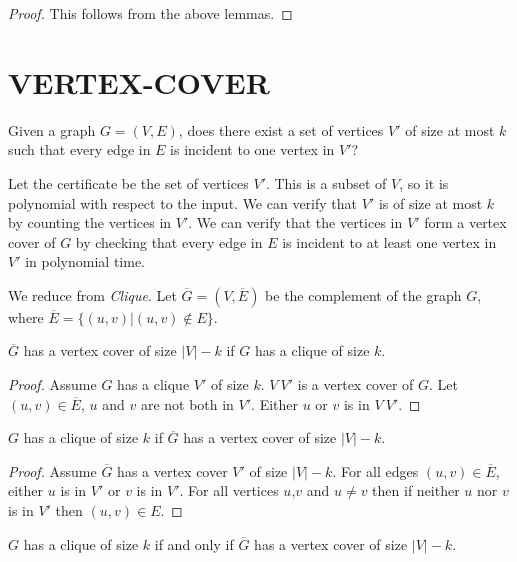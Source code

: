 \begin{proof}
  This follows from the above lemmas.
\end{proof}

\section{VERTEX-COVER}

Given a graph $G=(V,E)$, does there exist a set of vertices $V'$ of
size at most $k$ such that every edge in $E$ is incident to one vertex
in $V'$?

Let the certificate be the set of vertices $V'$.  This is a subset of
$V$, so it is polynomial with respect to the input.  We can verify
that $V'$ is of size at most $k$ by counting the vertices in $V'$.  We
can verify that the vertices in $V'$ form a vertex cover of $G$ by
checking that every edge in $E$ is incident to at least one vertex in
$V'$ in polynomial time.

We reduce from \emph{Clique}.  Let $\overline G = (V, \overline E)$ be
the complement of the graph $G$, where $\overline E = \{ (u,v) | (u,v)
\not \in E \}$.

\begin{lemma}
  $\overline G$ has a vertex cover of size $|V| - k$ if $G$ has a
  clique of size $k$.
\end{lemma}

\begin{proof}
  Assume $G$ has a clique $V'$ of size $k$.  $V \ V'$ is a vertex
  cover of $G$.  Let $(u,v) \in \overline E$, $u$ and $v$ are not both
  in $V'$.  Either $u$ or $v$ is in $V \ V'$.
\end{proof}

\begin{lemma}
  $G$ has a clique of size $k$ if $\overline G$ has a vertex cover of
  size $|V| - k$.
\end{lemma}

\begin{proof}
  Assume $\overline G$ has a vertex cover $V'$ of size $|V| - k$.  For
  all edges $(u,v) \in \overline E$, either $u$ is in $V'$ or $v$ is
  in $V'$.  For all vertices $u$,$v$ and $u \neq v$ then if neither
  $u$ nor $v$ is in $V'$ then $(u,v) \in E$.
\end{proof}

\begin{theorem}
  $G$ has a clique of size $k$ if and only if $\overline G$ has a
  vertex cover of size $|V| - k$.
\end{theorem}

